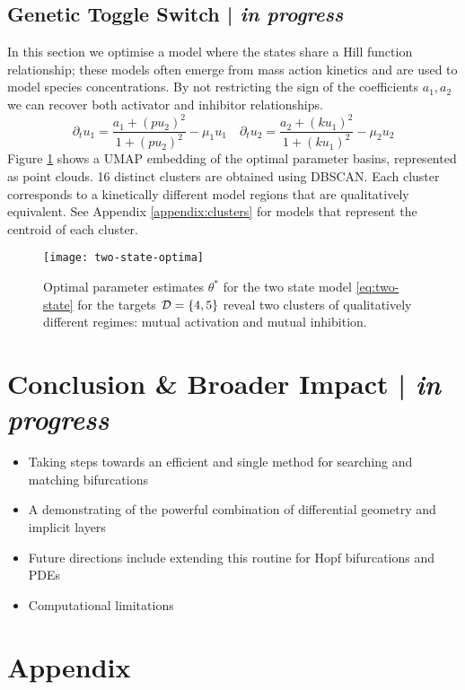 \subsection{Genetic Toggle Switch | \textit{in progress}}
In this section we optimise a model where the states share a Hill function relationship; these models often emerge from mass action kinetics and are used to model species concentrations. By not restricting the sign of the coefficients $a_1,a_2$ we can recover both activator and inhibitor relationships.
\begin{equation}
    \partial_t u_1 = \frac{ a_1 + (pu_2)^2} { 1 + (pu_2)^2 } - \mu_1 u_1 \quad
    \partial_t u_2 = \frac{ a_2 + (ku_1)^2} { 1 + (ku_1)^2 } - \mu_2 u_2
    \label{eq:two-state}
\end{equation}
Figure \ref{fig:two-state-optima} shows a UMAP embedding of the optimal parameter basins, represented as point clouds. 16 distinct clusters are obtained using DBSCAN. Each cluster corresponds to a kinetically different model regions that are qualitatively equivalent. See Appendix \ref{appendix:clusters} for models that represent the centroid of each cluster.
 
\begin{figure}
\centering
\texttt{[image: two-state-optima]}
\caption{Optimal parameter estimates $\theta^*$ for the two state model \eqref{eq:two-state} for the targets $\mathcal{D}=\{4,5\}$ reveal two clusters of qualitatively different regimes: mutual activation and mutual inhibition. }
\label{fig:two-state-optima}
\end{figure}
 
\section{Conclusion \& Broader Impact | \textit{in progress}}
\begin{itemize}
    \item Taking steps towards an efficient and single method for searching and matching bifurcations
    \item A demonstrating of the powerful combination of differential geometry and implicit layers
    \item Future directions include extending this routine for Hopf bifurcations and PDEs
    \item Computational limitations
\end{itemize}

% 




\section*{Appendix}
\appendix



